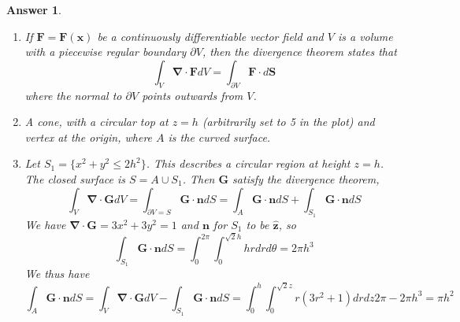 \documentclass[a4paper]{article}
\newtheorem{ans}{Answer}[section]
\theoremstyle{new}
\begin{document}
\begin{ans}\leavevmode
\begin{enumerate}[label=(\alph*)]
    \item If $\mathbf{F}=\mathbf{F}(\mathbf{x})$ be a continuously differentiable vector field and $V$ is a volume with a piecewise regular boundary $\partial V$, then the divergence theorem states that
$$\int_V\boldsymbol{\nabla}\cdot\mathbf{F}dV=\int_{\partial V}\mathbf{F}\cdot d\mathbf{S}$$
where the normal to $\partial V$ points outwards from $V$.
\item A cone, with a circular top at $z=h$ (arbitrarily set to 5 in the plot) and vertex at the origin, where $A$ is the curved surface.
\begin{center}
\end{center}
\item Let $S_1=\{x^2+y^2\leq 2h^2\}$. This describes a circular region at height $z=h$. The closed surface is $S=A\cup S_1$. Then $\mathbf{G}$ satisfy the divergence theorem,
$$\int_V\boldsymbol{\nabla}\cdot\mathbf{G}dV=\int_{\partial V=S}\mathbf{G}\cdot\mathbf{n}dS=\int_A\mathbf{G}\cdot\mathbf{n}dS+\int_{S_1}\mathbf{G}\cdot\mathbf{n}dS$$
We have $\boldsymbol{\nabla}\cdot\mathbf{G}=3x^2+3y^2=1$ and $\mathbf{n}$ for $S_1$ to be $\mathbf{\hat{z}}$, so
$$\int_{S_1}\mathbf{G}\cdot\mathbf{n}dS=\int_0^{2\pi}\int_0^{\sqrt{2}h}hrdrd\theta=2\pi h^3$$
We thus have
$$\int_A\mathbf{G}\cdot\mathbf{n}dS=\int_V\boldsymbol{\nabla}\cdot\mathbf{G}dV-\int_{S_1}\mathbf{G}\cdot\mathbf{n}dS=\int_0^h\int_0^{\sqrt{2}z}r(3r^2+1)drdz2\pi-2\pi h^3=\pi h^2$$
\end{enumerate}


\end{ans}
\newpage
\end{document}
